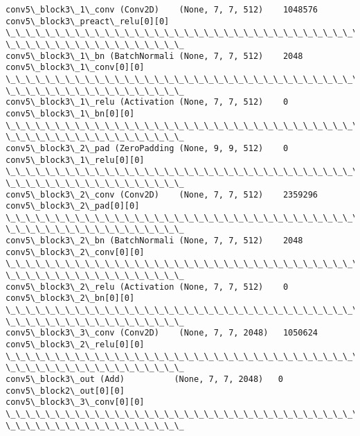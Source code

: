 \documentclass[11pt]{article}
\begin{document}
\begin{Verbatim}[commandchars=\\\{\}]
conv5\_block3\_1\_conv (Conv2D)    (None, 7, 7, 512)    1048576
conv5\_block3\_preact\_relu[0][0]
\_\_\_\_\_\_\_\_\_\_\_\_\_\_\_\_\_\_\_\_\_\_\_\_\_\_\_\_\_\_\_\_\_\_\_\_\_\_\_\_\_\_\_\_\_\_\_\_\_\_\_\_\_\_\_\_\_\_\_\_\_\_\_\_\_\_\_\_\_\_\_\_\_\_\_\_\_\_\_\_
\_\_\_\_\_\_\_\_\_\_\_\_\_\_\_\_\_\_
conv5\_block3\_1\_bn (BatchNormali (None, 7, 7, 512)    2048
conv5\_block3\_1\_conv[0][0]
\_\_\_\_\_\_\_\_\_\_\_\_\_\_\_\_\_\_\_\_\_\_\_\_\_\_\_\_\_\_\_\_\_\_\_\_\_\_\_\_\_\_\_\_\_\_\_\_\_\_\_\_\_\_\_\_\_\_\_\_\_\_\_\_\_\_\_\_\_\_\_\_\_\_\_\_\_\_\_\_
\_\_\_\_\_\_\_\_\_\_\_\_\_\_\_\_\_\_
conv5\_block3\_1\_relu (Activation (None, 7, 7, 512)    0
conv5\_block3\_1\_bn[0][0]
\_\_\_\_\_\_\_\_\_\_\_\_\_\_\_\_\_\_\_\_\_\_\_\_\_\_\_\_\_\_\_\_\_\_\_\_\_\_\_\_\_\_\_\_\_\_\_\_\_\_\_\_\_\_\_\_\_\_\_\_\_\_\_\_\_\_\_\_\_\_\_\_\_\_\_\_\_\_\_\_
\_\_\_\_\_\_\_\_\_\_\_\_\_\_\_\_\_\_
conv5\_block3\_2\_pad (ZeroPadding (None, 9, 9, 512)    0
conv5\_block3\_1\_relu[0][0]
\_\_\_\_\_\_\_\_\_\_\_\_\_\_\_\_\_\_\_\_\_\_\_\_\_\_\_\_\_\_\_\_\_\_\_\_\_\_\_\_\_\_\_\_\_\_\_\_\_\_\_\_\_\_\_\_\_\_\_\_\_\_\_\_\_\_\_\_\_\_\_\_\_\_\_\_\_\_\_\_
\_\_\_\_\_\_\_\_\_\_\_\_\_\_\_\_\_\_
conv5\_block3\_2\_conv (Conv2D)    (None, 7, 7, 512)    2359296
conv5\_block3\_2\_pad[0][0]
\_\_\_\_\_\_\_\_\_\_\_\_\_\_\_\_\_\_\_\_\_\_\_\_\_\_\_\_\_\_\_\_\_\_\_\_\_\_\_\_\_\_\_\_\_\_\_\_\_\_\_\_\_\_\_\_\_\_\_\_\_\_\_\_\_\_\_\_\_\_\_\_\_\_\_\_\_\_\_\_
\_\_\_\_\_\_\_\_\_\_\_\_\_\_\_\_\_\_
conv5\_block3\_2\_bn (BatchNormali (None, 7, 7, 512)    2048
conv5\_block3\_2\_conv[0][0]
\_\_\_\_\_\_\_\_\_\_\_\_\_\_\_\_\_\_\_\_\_\_\_\_\_\_\_\_\_\_\_\_\_\_\_\_\_\_\_\_\_\_\_\_\_\_\_\_\_\_\_\_\_\_\_\_\_\_\_\_\_\_\_\_\_\_\_\_\_\_\_\_\_\_\_\_\_\_\_\_
\_\_\_\_\_\_\_\_\_\_\_\_\_\_\_\_\_\_
conv5\_block3\_2\_relu (Activation (None, 7, 7, 512)    0
conv5\_block3\_2\_bn[0][0]
\_\_\_\_\_\_\_\_\_\_\_\_\_\_\_\_\_\_\_\_\_\_\_\_\_\_\_\_\_\_\_\_\_\_\_\_\_\_\_\_\_\_\_\_\_\_\_\_\_\_\_\_\_\_\_\_\_\_\_\_\_\_\_\_\_\_\_\_\_\_\_\_\_\_\_\_\_\_\_\_
\_\_\_\_\_\_\_\_\_\_\_\_\_\_\_\_\_\_
conv5\_block3\_3\_conv (Conv2D)    (None, 7, 7, 2048)   1050624
conv5\_block3\_2\_relu[0][0]
\_\_\_\_\_\_\_\_\_\_\_\_\_\_\_\_\_\_\_\_\_\_\_\_\_\_\_\_\_\_\_\_\_\_\_\_\_\_\_\_\_\_\_\_\_\_\_\_\_\_\_\_\_\_\_\_\_\_\_\_\_\_\_\_\_\_\_\_\_\_\_\_\_\_\_\_\_\_\_\_
\_\_\_\_\_\_\_\_\_\_\_\_\_\_\_\_\_\_
conv5\_block3\_out (Add)          (None, 7, 7, 2048)   0
conv5\_block2\_out[0][0]
conv5\_block3\_3\_conv[0][0]
\_\_\_\_\_\_\_\_\_\_\_\_\_\_\_\_\_\_\_\_\_\_\_\_\_\_\_\_\_\_\_\_\_\_\_\_\_\_\_\_\_\_\_\_\_\_\_\_\_\_\_\_\_\_\_\_\_\_\_\_\_\_\_\_\_\_\_\_\_\_\_\_\_\_\_\_\_\_\_\_
\_\_\_\_\_\_\_\_\_\_\_\_\_\_\_\_\_\_

\end{Verbatim}
\end{document}
